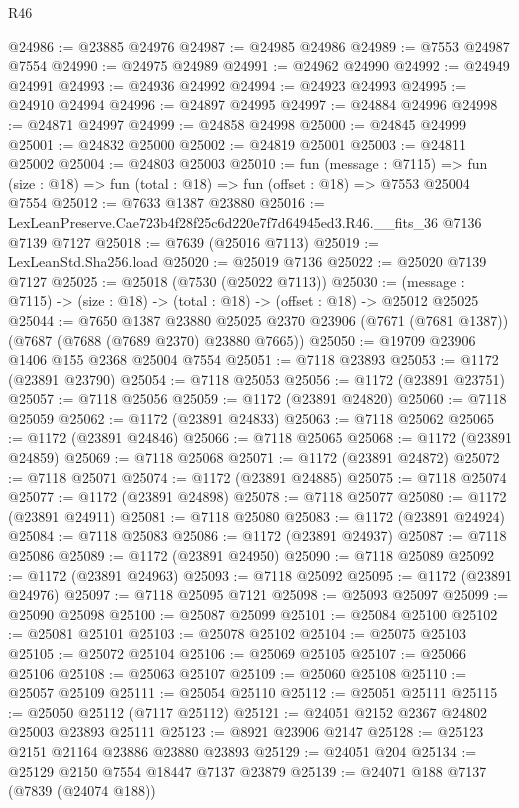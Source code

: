 \begin{lexlean}{R46}
\begin{coremodule}
@24986 := @23885 @24976
@24987 := @24985 @24986
@24989 := @7553 @24987 @7554
@24990 := @24975 @24989
@24991 := @24962 @24990
@24992 := @24949 @24991
@24993 := @24936 @24992
@24994 := @24923 @24993
@24995 := @24910 @24994
@24996 := @24897 @24995
@24997 := @24884 @24996
@24998 := @24871 @24997
@24999 := @24858 @24998
@25000 := @24845 @24999
@25001 := @24832 @25000
@25002 := @24819 @25001
@25003 := @24811 @25002
@25004 := @24803 @25003
@25010 := fun (message : @7115) =>
  fun (size : @18) => fun (total : @18) => fun (offset : @18) => @7553 @25004 @7554
@25012 := @7633 @1387 @23880
@25016 := LexLeanPreserve.Cae723b4f28f25c6d220e7f7d64945ed3.R46.__fits_36 @7136 @7139 @7127
@25018 := @7639 (@25016 @7113)
@25019 := LexLeanStd.Sha256.load
@25020 := @25019 @7136
@25022 := @25020 @7139 @7127
@25025 := @25018 (@7530 (@25022 @7113))
@25030 := (message : @7115) -> (size : @18) -> (total : @18) -> (offset : @18) -> @25012 @25025
@25044 := @7650
    @1387
    @23880
    @25025
    @2370
    @23906
    (@7671 (@7681 @1387))
    (@7687 (@7688 (@7689 @2370) @23880 @7665))
@25050 := @19709 @23906 @1406 @155 @2368 @25004 @7554
@25051 := @7118 @23893
@25053 := @1172 (@23891 @23790)
@25054 := @7118 @25053
@25056 := @1172 (@23891 @23751)
@25057 := @7118 @25056
@25059 := @1172 (@23891 @24820)
@25060 := @7118 @25059
@25062 := @1172 (@23891 @24833)
@25063 := @7118 @25062
@25065 := @1172 (@23891 @24846)
@25066 := @7118 @25065
@25068 := @1172 (@23891 @24859)
@25069 := @7118 @25068
@25071 := @1172 (@23891 @24872)
@25072 := @7118 @25071
@25074 := @1172 (@23891 @24885)
@25075 := @7118 @25074
@25077 := @1172 (@23891 @24898)
@25078 := @7118 @25077
@25080 := @1172 (@23891 @24911)
@25081 := @7118 @25080
@25083 := @1172 (@23891 @24924)
@25084 := @7118 @25083
@25086 := @1172 (@23891 @24937)
@25087 := @7118 @25086
@25089 := @1172 (@23891 @24950)
@25090 := @7118 @25089
@25092 := @1172 (@23891 @24963)
@25093 := @7118 @25092
@25095 := @1172 (@23891 @24976)
@25097 := @7118 @25095 @7121
@25098 := @25093 @25097
@25099 := @25090 @25098
@25100 := @25087 @25099
@25101 := @25084 @25100
@25102 := @25081 @25101
@25103 := @25078 @25102
@25104 := @25075 @25103
@25105 := @25072 @25104
@25106 := @25069 @25105
@25107 := @25066 @25106
@25108 := @25063 @25107
@25109 := @25060 @25108
@25110 := @25057 @25109
@25111 := @25054 @25110
@25112 := @25051 @25111
@25115 := @25050 @25112 (@7117 @25112)
@25121 := @24051 @2152 @2367 @24802 @25003 @23893 @25111
@25123 := @8921 @23906 @2147
@25128 := @25123 @2151 @21164 @23886 @23880 @23893
@25129 := @24051 @204
@25134 := @25129 @2150 @7554 @18447 @7137 @23879
@25139 := @24071 @188 @7137 (@7839 (@24074 @188))

\end{coremodule}
\end{lexlean}
